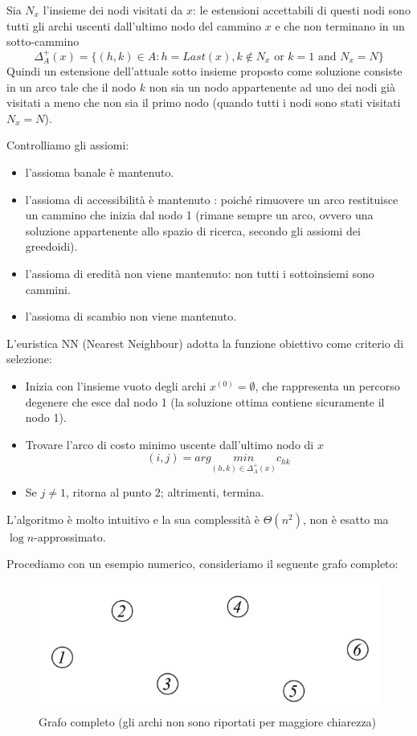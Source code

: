 \documentclass{article}
\begin{document}
Sia $N_x$ l'insieme dei nodi visitati da $x$: le estensioni accettabili di questi nodi sono tutti gli
archi uscenti dall'ultimo nodo del cammino $x$ e che non terminano in un sotto-cammino
$$\Delta_A^+(x)=\{(h,k)\in A : h=Last(x),k\notin N_x\text{ or } k=1 \text{ and } N_x=N\}$$
Quindi un estensione dell'attuale sotto insieme proposto come soluzione consiste in un arco
tale che il nodo $k$ non sia un nodo appartenente ad uno dei nodi già visitati a meno che non sia il
primo nodo (quando tutti i nodi sono stati visitati $N_x=N$).

Controlliamo gli assiomi:
\begin{itemize}
    \item l'assioma banale è mantenuto.
    \item l'assioma di accessibilità è mantenuto : poiché rimuovere un arco restituisce un cammino che
          inizia dal nodo 1 (rimane sempre un arco, ovvero una soluzione appartenente allo spazio di ricerca,
          secondo gli assiomi dei greedoidi).
    \item l'assioma di eredità non viene mantenuto: non tutti i sottoinsiemi sono cammini.
    \item l'assioma di scambio non viene mantenuto.
\end{itemize}

L'euristica NN (Nearest Neighbour) adotta la funzione obiettivo come criterio di selezione:
\begin{itemize}
    \item Inizia con l'insieme vuoto degli archi $x^{(0)}=\emptyset$, che
          rappresenta un percorso degenere che esce dal nodo 1 (la soluzione ottima
          contiene sicuramente il nodo 1).
    \item Trovare l'arco di costo minimo uscente dall'ultimo nodo di $x$
          $$(i,j)= arg\underset{(h,k)\in\Delta_A^+(x)}{min}c_{hk}$$
    \item Se $j\neq 1$, ritorna al punto 2; altrimenti, termina.
\end{itemize}
L'algoritmo è molto intuitivo e la sua complessità è $\Theta(n^2)$, non è esatto ma
$\log n$-approssimato.

Procediamo con un esempio numerico, consideriamo il seguente grafo completo:
\begin{figure}[H]
    \centering
    \includegraphics[scale=0.4]{images/nume_exampl-NN-tsp.png}
    \caption{Grafo completo (gli archi non sono riportati per maggiore chiarezza)}
\end{figure}
\end{document}
